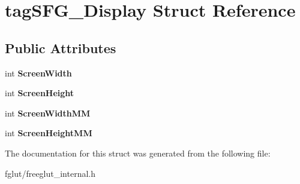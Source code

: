 \hypertarget{structtag_s_f_g___display}{}\section{tag\+S\+F\+G\+\_\+\+Display Struct Reference}
\label{structtag_s_f_g___display}
\subsection*{Public Attributes}
\begin{DoxyCompactItemize}
\item 
int {\bfseries Screen\+Width}\hypertarget{structtag_s_f_g___display_afcb8f49d104b6eaf8c15d949ec9aeb09}{}\label{structtag_s_f_g___display_afcb8f49d104b6eaf8c15d949ec9aeb09}

\item 
int {\bfseries Screen\+Height}\hypertarget{structtag_s_f_g___display_a76c0f9c86cad5a3160e87707934e2392}{}\label{structtag_s_f_g___display_a76c0f9c86cad5a3160e87707934e2392}

\item 
int {\bfseries Screen\+Width\+MM}\hypertarget{structtag_s_f_g___display_afe00cd0b779e649422435b3bede6d9b6}{}\label{structtag_s_f_g___display_afe00cd0b779e649422435b3bede6d9b6}

\item 
int {\bfseries Screen\+Height\+MM}\hypertarget{structtag_s_f_g___display_ae937d28dd23eec85badebd78bfc8fcbf}{}\label{structtag_s_f_g___display_ae937d28dd23eec85badebd78bfc8fcbf}

\end{DoxyCompactItemize}


The documentation for this struct was generated from the following file\+:\begin{DoxyCompactItemize}
\item 
fglut/freeglut\+\_\+internal.\+h\end{DoxyCompactItemize}
